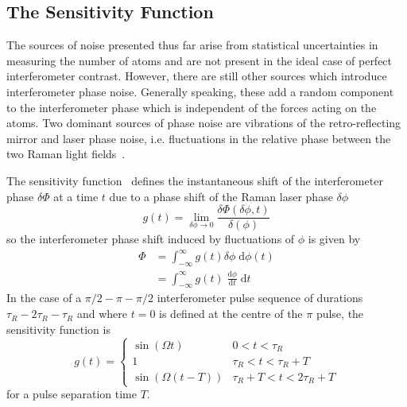 \subsection{The Sensitivity Function}\label{subsec:sens_func}
The sources of noise presented thus far arise from statistical
uncertainties in measuring the number of atoms and are not present in
the ideal case of perfect interferometer contrast. However, there are
still other sources which introduce interferometer phase noise. Generally speaking, these add a random component to
the interferometer phase which is independent of the forces acting on
the atoms. Two dominant sources of phase noise are vibrations of the
retro-reflecting mirror and laser phase noise, i.e. fluctuations in
the relative phase between the two Raman light
fields~\cite{Cheinet2008}.
\par\noindent
The sensitivity function~\cite{Dick1987}
defines the instantaneous shift of the
interferometer phase \(\delta\Phi\) at a time \(t\) due to a phase
shift of the Raman laser phase \(\delta \phi\)
\begin{equation}
  g(t) = \lim_{\delta\phi \rightarrow 0} \frac{\delta\Phi(\delta \phi,
  t)}{\delta(\phi)}
  \label{eq:sensitivity_def}
\end{equation}
so the interferometer phase shift induced by fluctuations of
\(\phi\) is given by
\begin{align}
  \Phi &= \int_{-\infty}^\infty g(t)\delta \phi\;\mathrm{d}\phi(t)
  \nonumber\\
  &= \int_{-\infty}^\infty g(t)\;\frac{\mathrm{d}\phi}{\mathrm{d} t}\;
  \mathrm{d}t
  \label{eq:phase_contrib}
\end{align}
In the case of a \(\pi/2-\pi-\pi/2\) interferometer pulse sequence of
durations \(\tau_R-2 \tau_R - \tau_R\) and where \(t=0\) is defined at
the centre of the \(\pi\) pulse, the sensitivity function is 
\begin{equation}
    g(t) = 
    \begin{cases}
      \sin ( \Omega t) & 0<t<\tau_R  \\
      1 & \tau_R <t<\tau_R +T \\
      \sin (\Omega  (t-T)) & \tau_R +T<t<2 \tau_R +T
  \end{cases}
\label{eq:sensitivity_interferometer}
\end{equation}
for a pulse separation time \(T\).  
